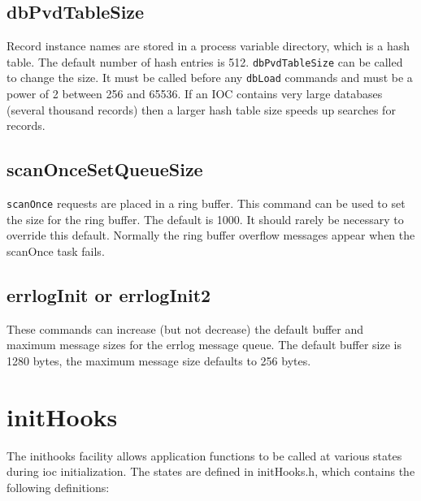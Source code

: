 \subsection{dbPvdTableSize}

Record instance names are stored in a process variable directory, which is a hash table. The default number of hash entries 
is 512. \verb|dbPvdTableSize| can be called to change the size. It must be called before any \verb|dbLoad| commands and must 
be a power of 2 between 256 and 65536. If an IOC contains very large databases (several thousand records) then a larger 
hash table size speeds up searches for records.

\subsection{scanOnceSetQueueSize}

\verb|scanOnce| requests are placed in a ring buffer. This command can be used to set the size for the ring buffer. The default 
is 1000. It should rarely be necessary to override this default. Normally the ring buffer overflow messages appear when 
the scanOnce task fails.

\subsection{errlogInit or errlogInit2}

These commands can increase (but not decrease) the default buffer and maximum message sizes for the errlog message 
queue. The default buffer size is 1280 bytes, the maximum message size defaults to 256 bytes.

\section{initHooks}

The inithooks facility allows application functions to be called at various states during ioc initialization. The states are 
defined in initHooks.h, which contains the following definitions:

